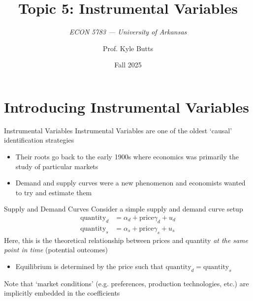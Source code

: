 \documentclass[aspectratio=169,t,11pt,table]{beamer}
\title{Topic 5: Instrumental Variables}
\subtitle{\it  ECON 5783 — University of Arkansas}
\date{Fall 2025}
\author{Prof. Kyle Butts}
\begin{document}
\begin{frame}
\maketitle

\end{frame}

\section{Introducing Instrumental Variables}

\begin{frame}{Instrumental Variables}
  Instrumental Variables are one of the oldest `causal' identification strategies
  \begin{itemize}
    \item Their roots go back to the early 1900s where economics was primarily the study of particular markets
    
    \item Demand and supply curves were a new phenomenon and economists wanted to try and estimate them 
  \end{itemize}
\end{frame}

\begin{frame}{Supply and Demand Curves}
  Consider a simple supply and demand curve setup
  \begin{align}
    \text{quantity}_{d} &= \alpha_{d} + \text{price}\gamma_{d} + u_{d} \\
    \text{quantity}_{s} &= \alpha_{s} + \text{price}\gamma_{s} + u_{s}
  \end{align}
  Here, this is the theoretical relationship between prices and quantity \emph{at the same point in time} (potential outcomes)
  \begin{itemize}
    \item Equilibrium is determined by the $\text{price}$ such that $\text{quantity}_{d} = \text{quantity}_{s}$
  \end{itemize}

  \bigskip
  Note that `market conditions' (e.g. preferences, production technologies, etc.) are implicitly embedded in the coefficients
\end{frame}
\end{document}
